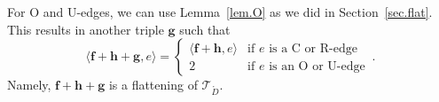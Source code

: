 \documentclass[12pt,reqno]{amsart}
\theoremstyle{definition}
\def\calT{\mathcal T}
\renewcommand{\Ddot}{\mathring{D}}
\begin{document}
For O and U-edges, we can use Lemma~\ref{lem.O} as we did in Section~\ref{sec.flat}.
This results in  another triple $\boldsymbol g $ such that 
\begin{equation*}
\langle \boldsymbol f+ \boldsymbol h + \boldsymbol g , e \rangle  
=\begin{cases}
  \langle \boldsymbol f+ \boldsymbol h , e \rangle & \textrm{if } e
  \textrm{ is a C or R-edge} \\
2 & \textrm{if } e \textrm{ is an O or U-edge} 
\end{cases}\,.
\end{equation*}
Namely, $\boldsymbol f+ \boldsymbol h+\boldsymbol g $ is a flattening of $\calT_{\Ddot}$.


%


\end{document}
